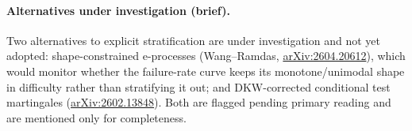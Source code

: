 \documentclass[11pt,a4paper]{article}
\begin{document}
\paragraph{Alternatives under investigation (brief).}
Two alternatives to explicit stratification are under investigation and not yet adopted:
shape-constrained e-processes (Wang--Ramdas, \href{https://arxiv.org/abs/2604.20612}{arXiv:2604.20612}),
which would monitor whether the failure-rate curve keeps its monotone/unimodal shape in
difficulty rather than stratifying it out; and DKW-corrected conditional test martingales
(\href{https://arxiv.org/abs/2602.13848}{arXiv:2602.13848}).  Both are flagged pending primary
reading and are mentioned only for completeness.
\end{document}
